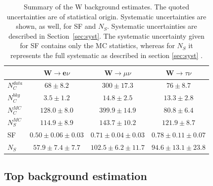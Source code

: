 \begin{table}[!htb]
\centering
\begin{tabular}{|l|c|c|c|}
\hline
 & W$\rightarrow$e$\nu$ & W$\rightarrow\mu\nu$ & W$\rightarrow\tau\nu$ \\
\hline\hline
$N_{C}^{data}$ & $68\pm 8.2$& $300\pm 17.3$ & $76\pm 8.7$\\
$N_{C}^{bkg}$   &$3.5\pm 1.2$ & $14.8\pm 2.5$ & $13.3\pm 2.8$ \\
$N_{C}^{MC}$ &  $128.0\pm 8.0$ & $399.9\pm 14.9$ & $80.8\pm 6.4$   \\
$N_{S}^{MC}$ & $114.9\pm8.9$ & $143.7\pm10.2$ & $121.9\pm8.7$  \\
\hline\hline
SF & $0.50\pm0.06\pm0.03$ & $0.71\pm0.04\pm0.03$ & $0.78\pm0.11\pm0.07$ \\
\hline\hline
$N_{S}$ & $57.9\pm7.4\pm7.7$ & $102.5\pm6.2\pm11.7$ & $94.6\pm13.1\pm23.8$ \\
\hline
\end{tabular}
\caption{\label{tab:ZWTopRes} Summary of the W background estimates. The quoted uncertainties are of statistical origin. Systematic uncertainties are shown, as well, for SF and $N_S$. Systematic uncertainties are described in Section~\ref{sec:syst}. The systematic uncertainty given for SF contains only the MC statistics, whereas for $N_{S}$ it represents the full systematic as described in section \ref{sec:syst} \cite{ARTICLE:CMSVBFHiggsInvisibleParkedAnalysisPAS}.}
\end{table}


\subsection{Top background estimation}
\label{SECTION:ParkedDataAnalysis_ControlRegions_TopBackground}


